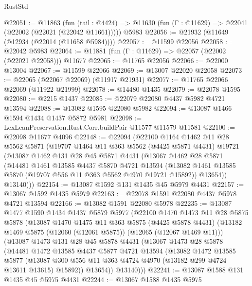 \begin{lexlean}{RustStd}
\begin{coremodule}
@22051 := @11863
    (fun (tail : @4424) => @11630 (fun (Γ : @11629) => @22041 (@22002 (@22021 (@22042 @11661)))))
    @5983
@22056 := @21932 (@11649 (@12934 (@22014 (@11658 @5984))))
@22057 := @11599 @22056
@22058 := @22042 @5983
@22064 := @11881 (fun (Γ : @11629) => @22057 (@22002 (@22021 @22058))) @11677
@22065 := @11765 @22056
@22066 := @22000 @13004
@22067 := @11599 @22066
@22069 := @13007 @22020 @22058
@22073 := @22065 (@22067 @22069) (@11917 @21931)
@22077 := @11765 @22066 @22069 (@11922 @21999)
@22078 := @14480 @1435
@22079 := @22078 @1595
@22080 := @2215 @1437
@22085 := @22079 @22080 @4437 @5982 @4721 @13594
@22088 := @13082 @1595 @22080 @5982
@22094 := @13087 @1466 @1594 @1434 @1437 @5872 @5981
@22098 := LexLeanPreservation.Rust.Corr.buildPair @11577 @11579 @11581
@22100 := @22098 @11677 @4096
@22148 := @22094
    (@22100
      @1164
      @1462
      @11
      @28
      @5562
      @5871
      (@19707
        @1464
        @11
        @363
        @5562
        (@4425 @5871 @4431)
        @19721
        (@13087
          @1462
          @131
          @28
          @45
          @5871
          @4431
          (@13067
            @1462
            @28
            @5871
            (@14481
              @1461
              @13585
              @4437
              @5870
              @4721
              @13594
              (@13082 @1461 @13585 @5870 (@19707 @556 @11 @363 @5562 @4970 @19721 @15892))
              @13654))
          @13140)))
@22154 := @13087 @1592 @131 @1435 @45 @5979 @4431
@22157 := @13067 @1592 @1435 @5979
@22163 := @22078 @1591 @22080 @4437 @5978 @4721 @13594
@22166 := @13082 @1591 @22080 @5978
@22235 := @13087
    @1477
    @1590
    @1434
    @1437
    @5879
    @5977
    (@22100
      @1470
      @1473
      @11
      @28
      @5875
      @5878
      (@13087
        @1470
        @1475
        @11
        @363
        @5875
        (@4425 @5878 @4431)
        (@13182 @1469 @5875 (@12060 (@12061 @5875)) (@12065 (@12067 @1469 @11)))
        (@13087
          @1473
          @131
          @28
          @45
          @5878
          @4431
          (@13067
            @1473
            @28
            @5878
            (@14481
              @1472
              @13585
              @4437
              @5877
              @4721
              @13594
              (@13082
                @1472
                @13585
                @5877
                (@13087 @300 @556 @11 @363 @4724 @4970 (@13182 @299 @4724 @13611 @13615) @15892))
              @13654))
          @13140)))
@22241 := @13087 @1588 @131 @1435 @45 @5975 @4431
@22244 := @13067 @1588 @1435 @5975

\end{coremodule}
\end{lexlean}
